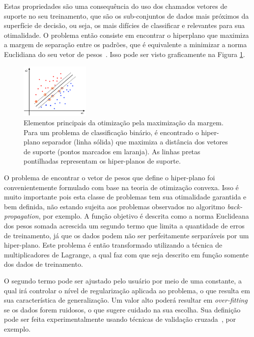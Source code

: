 \documentclass[conference]{IEEEtran}
\begin{document}
	Estas propriedades são uma consequência do uso dos chamados vetores de suporte no seu treinamento, que são os sub-conjuntos de dados mais próximos da superfície de decisão, ou seja, os mais difícies de classificar e relevantes para sua otimalidade. O problema então consiste em encontrar o hiperplano que maximiza a margem de separação entre os padrões, que é equivalente a minimizar a norma Euclidiana do seu vetor de pesos~\cite{haykin2007neural}. Isso pode ser visto graficamente na Figura \ref{fig:svm}.
	
	\begin{figure}[thpbh]
		\centering
		\includegraphics[width=0.3\textwidth]{svm-hp.png}
		\caption{Elementos principais da otimização pela maximização da margem. Para um problema de classificação binário, é encontrado o hiper-plano separador (linha sólida) que maximiza a distância dos vetores de suporte (pontos marcados em laranja). As linhas pretas pontilhadas representam os hiper-planos de suporte.}
		\label{fig:svm}
	\end{figure}
	
	O problema de encontrar o vetor de pesos que define o hiper-plano foi convenientemente formulado com base na teoria de otimização convexa. Isso é muito importante pois esta classe de problemas tem sua otimalidade garantida e bem definida, não estando sujeita aos problemas observados no algoritmo \textit{back-propagation}, por exemplo. A função objetivo é descrita como a norma Euclideana dos pesos somada acrescida um segundo termo que limita a quantidade de erros de treinamento, já que os dados podem não ser perfeitamente serparáveis por um hiper-plano. Este problema é então transformado utilizando a técnica de multiplicadores de Lagrange, a qual faz com que seja descrito em função somente dos dados de treinamento.
	
	O segundo termo pode ser ajustado pelo usuário por meio de uma constante, a qual irá controlar o nível de regularização aplicada ao problema, o que resulta em sua característica de generalização. Um valor alto poderá resultar em \textit{over-fitting} se os dados forem ruidosos, o que sugere cuidado na sua escolha.	Sua definição pode ser feita experimentalmente usando técnicas de validação cruzada~\cite{arlot2010survey}, por exemplo.
	
\end{document}
